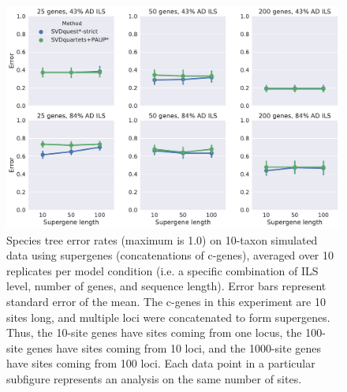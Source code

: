 \begin{figure}
  \centering
  \includegraphics[width=\textwidth]{svdquest-figs/binned_rfdists_paup_10tax.pdf}
  \caption[Species tree error rates of SVDquest*-strict and SVDquartets+PAUP* on 10-taxon supergene datasets]{Species tree error rates (maximum is 1.0) on 10-taxon simulated data using 
    supergenes (concatenations of c-genes), averaged over 10
    replicates per model condition (i.e. a specific combination of ILS level, number of genes, and sequence length). Error bars represent standard error of the mean. The c-genes in this experiment are 10 sites long, and multiple loci were
    concatenated to form supergenes. Thus, the 
    10-site genes have sites coming from one locus, the 100-site genes have
    sites coming from 10 loci, and the 1000-site genes have sites coming
    from 100 loci. Each data point in a particular subfigure represents
    an analysis on the same number of sites.
  } %
  \label{fig:s11}
\end{figure}





